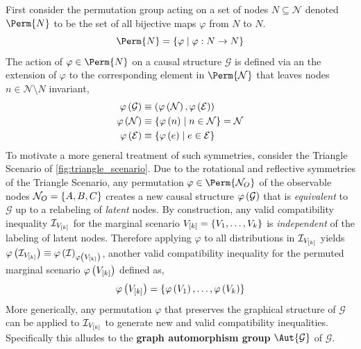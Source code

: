 \documentclass[aps, 10pt, english, twoside, pra, nofootinbib, longbibliography]{revtex4-1}
\theoremstyle{plain}
\theoremstyle{definition}
\newtheorem{example}[theorem]{Example}
\theoremstyle{remark}
\newcommand{\graph}{\mathcal{G}}
\newcommand{\nodes}{\mathcal{N}}
\newcommand{\edges}{\mathcal{E}}
\newcommand{\term}[1]{\textcolor{Mahogany}{\textbf{#1}}}
\begin{document}
    First consider the permutation group acting on a set of nodes $N \subseteq \nodes$ denoted $\Perm{N}$ to be the set of all bijective maps $\varphi$ from $N$ to $N$.
    \[ \Perm{N} = \bc{\varphi \mid \varphi : N \to N} \]
    The action of $\varphi \in \Perm{N}$ on a causal structure $\graph$ is defined via an the extension of $\varphi$ to the corresponding element in $\Perm{\nodes}$ that leaves nodes $n \in \nodes \setminus N$ invariant,
    \begin{align*}
    \varphi\br{\graph} &\defined \br{\varphi\br{\nodes}, \varphi\br{\edges}} \\
    \varphi\br{\nodes} &\defined \bc{\varphi\br{n} \mid n \in \nodes} = \nodes \\
    \varphi\br{\edges} &\defined \bc{\varphi\br{e} \mid e \in \edges}
    \end{align*}
    To motivate a more general treatment of such symmetries, consider the Triangle Scenario of \cref{fig:triangle_scenario}. Due to the rotational and reflective symmetries of the Triangle Scenario, any permutation $\varphi \in \Perm{\nodes_O}$ of the observable nodes $\nodes_O = \bc{A, B, C}$ creates a new causal structure $\varphi\br{\graph}$ that is \textit{equivalent} to $\graph$ up to a relabeling of \textit{latent} nodes. By construction, any valid compatibility inequality $\mathcal{I}_{V_{\left[ k \right]}}$ for the marginal scenario $V_{\left[ k \right]} = \left\{ V_1, \ldots, V_k \right\}$ is \textit{independent} of the labeling of latent nodes. Therefore applying $\varphi$ to all distributions in $\mathcal{I}_{V_{\left[ k \right]}}$ yields $\varphi\left( \mathcal{I}_{V_{\left[ k \right]}} \right) \equiv \varphi\left( \mathcal{I} \right)_{\varphi\left( V_{\left[ k \right]} \right)}$, another valid compatibility inequality for the permuted marginal scenario $\varphi\left( V_{\left[ k \right]} \right)$ defined as,
    \[ \varphi\left( V_{\left[ k \right]} \right) = \left\{ \varphi\left( V_1 \right), \ldots, \varphi\left( V_k \right) \right\} \]
    More generically, any permutation $\varphi$ that preserves the graphical structure of $\graph$ can be applied to $\mathcal{I}_{V_{\left[ k \right]}}$ to generate new and valid compatibility inequalities. Specifically this alludes to the \term{graph automorphism group} $\Aut{\graph}$ of $\graph$.
\end{document}
